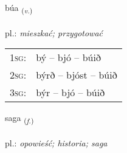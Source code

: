 \documentclass[frontgrid, backgrid]{flacards}\usepackage[]{graphicx}\usepackage[]{xcolor}
\begin{document}
\renewcommand{\flhead}{\vskip5pt \fboxsep=0pt {\small\bfseries\footnotesize Sagnorð | czasownik}}
\renewcommand{\fcfoot}{\vskip5pt \fboxsep=0pt \hspace{2pt}{\small\bfseries\footnotesize 1K}}

\renewcommand{\blhead}{\vskip5pt {\small\bfseries\footnotesize Sagnorð | czasownik }}
\renewcommand{\bcfoot}{\vskip5pt \hspace{2pt}{\small\bfseries\footnotesize 1K}}


{búa \small{\textsubscript{(\textit{v.})}} \\[1ex] %
\textphonetic{[puːa]} \\
pl.: \emph{mieszkać; przygotować} \\  [2ex]
\renewcommand*{\arraystretch}{0.8}
\begin{tabular}{p{1cm}l}
\textsc{1sg}: & bý -- bjó -- búið \\ 
\textsc{2sg}: & býrð -- bjóst -- búið \\ 
\textsc{3sg}: & býr -- bjó -- búið \\ 
\end{tabular}
}

\renewcommand{\flhead}{\vskip5pt \fboxsep=0pt {\small\bfseries\footnotesize Nafnorð | rzeczownik}}
\renewcommand{\fcfoot}{\vskip5pt \fboxsep=0pt \hspace{2pt}{\small\bfseries\footnotesize 1K}}

\renewcommand{\blhead}{\vskip5pt {\small\bfseries\footnotesize Nafnorð | rzeczownik }}
\renewcommand{\bcfoot}{\vskip5pt \hspace{2pt}{\small\bfseries\footnotesize 1K}}


{saga \small{\textsubscript{(\textit{f.})}} \\[1ex] %
\textphonetic{[saːɣa]} \\
pl.: \emph{opowieść; historia; saga} \\  [2ex]
\renewcommand*{\arraystretch}{0.8}
}
\end{document}
